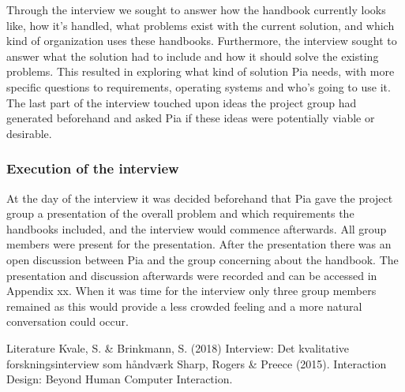 Through the interview we sought to answer how the handbook currently looks like, how it’s handled, what problems exist with the current solution, and which kind of organization uses these handbooks. Furthermore, the interview sought to answer what the solution had to include and how it should solve the existing problems. This resulted in exploring what kind of solution Pia needs, with more specific questions to requirements, operating systems and who’s going to use it. The last part of the interview touched upon ideas the project group had generated beforehand and asked Pia if these ideas were potentially viable or desirable.

\subsubsection{Execution of the interview}

At the day of the interview it was decided beforehand that Pia gave the project group a presentation of the overall problem and which requirements the handbooks included, and the interview would commence afterwards. All group members were present for the presentation. After the presentation there was an open discussion between Pia and the group concerning about the handbook. The presentation and discussion afterwards were recorded and can be accessed in Appendix xx. When it was time for the interview only three group members remained as this would provide a less crowded feeling and a more natural conversation could occur.
 
Literature
 Kvale, S. \& Brinkmann, S.  (2018) Interview: Det kvalitative forskningsinterview som håndværk
Sharp, Rogers \& Preece (2015). Interaction Design: Beyond Human Computer Interaction.
 

